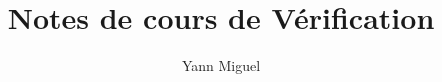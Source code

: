 \documentclass[a4paper, 12pt]{article}
\title{Notes de cours de V\'erification}
\author{Yann Miguel}
\begin{document}
\ttfamily
\maketitle
\tableofcontents
\newpage



\end{document}
